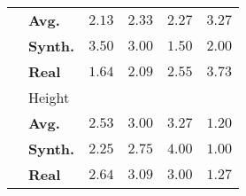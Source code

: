 \begin{table*}[!htbp]
{\begin{tabular}{llrrrr}
		 & \qquad\textbf{Avg.} & $\mathbf{2.13}$ & $2.33$ & $2.27$ & $3.27$\\
		 & \qquad\textbf{Synth.} &  $3.50$ &  $3.00$ &  $\mathbf{1.50}$ &  $2.00$\\
		 & \qquad\textbf{Real} &  $\mathbf{1.64}$ & $2.09$ & $2.55$ & $3.73$\\
		\cmidrule{2-6}
		 & Height &  &  &  & \\
		 & \qquad\textbf{Avg.} & $2.53$ & $3.00$ & $3.27$ & $\mathbf{1.20}$\\
		 & \qquad\textbf{Synth.} &  $2.25$ &  $2.75$ &  $4.00$ &  $\mathbf{1.00}$\\
		 & \qquad\textbf{Real} & $2.64$ & $3.09$ & $3.00$ &  $\mathbf{1.27}$\\
		\bottomrule
	\end{tabular}}
\end{table*}
